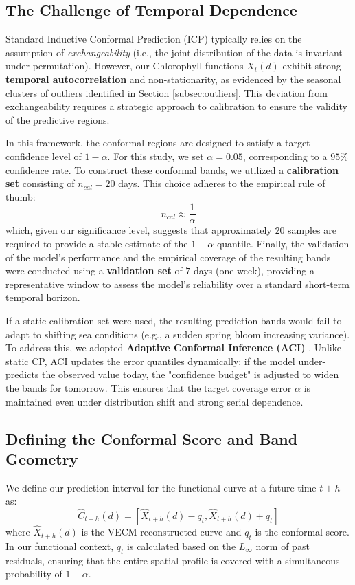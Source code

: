 \subsection{The Challenge of Temporal Dependence}

Standard Inductive Conformal Prediction (ICP) typically relies on the assumption of \textit{exchangeability} (i.e., the joint distribution of the data is invariant under permutation). However, our Chlorophyll functions $X_t(d)$ exhibit strong \textbf{temporal autocorrelation} and non-stationarity, as evidenced by the seasonal clusters of outliers identified in Section \ref{subsec:outliers}. This deviation from exchangeability requires a strategic approach to calibration to ensure the validity of the predictive regions.

In this framework, the conformal regions are designed to satisfy a target confidence level of $1 - \alpha$. For this study, we set $\alpha = 0.05$, corresponding to a $95\%$ confidence rate. To construct these conformal bands, we utilized a \textbf{calibration set} consisting of $n_{cal} = 20$ days. This choice adheres to the empirical rule of thumb:
\begin{equation}
    n_{cal} \approx \frac{1}{\alpha}
\end{equation}
which, given our significance level, suggests that approximately $20$ samples are required to provide a stable estimate of the $1-\alpha$ quantile. Finally, the validation of the model's performance and the empirical coverage of the resulting bands were conducted using a \textbf{validation set} of $7$ days (one week), providing a representative window to assess the model's reliability over a standard short-term temporal horizon.

If a static calibration set were used, the resulting prediction bands would fail to adapt to shifting sea conditions (e.g., a sudden spring bloom increasing variance). To address this, we adopted \textbf{Adaptive Conformal Inference (ACI)} \cite{gibbs2021adaptive}. Unlike static CP, ACI updates the error quantiles dynamically: if the model under-predicts the observed value today, the "confidence budget" is adjusted to widen the bands for tomorrow. This ensures that the target coverage error $\alpha$ is maintained even under distribution shift and strong serial dependence.


\subsection{Defining the Conformal Score and Band Geometry}
We define our prediction interval for the functional curve at a future time $t+h$ as:
$$ \hat{C}_{t+h}(d) = [ \hat{X}_{t+h}(d) - q_t, \hat{X}_{t+h}(d) + q_t ] $$
where $\hat{X}_{t+h}(d)$ is the VECM-reconstructed curve and $q_t$ is the conformal score. In our functional context, $q_t$ is calculated based on the $L_\infty$ norm of past residuals, ensuring that the entire spatial profile is covered with a simultaneous probability of $1-\alpha$.


